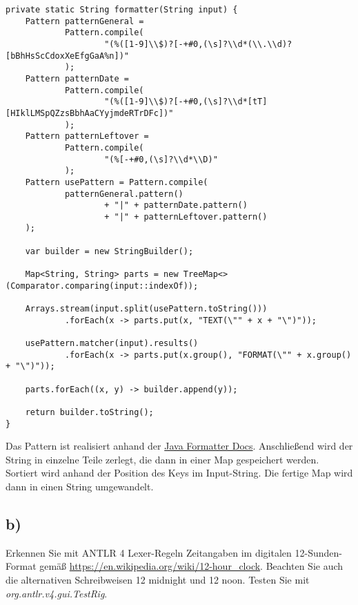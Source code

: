 \begin{lstlisting}[label={lst:Aufgabe1a}]
private static String formatter(String input) {
    Pattern patternGeneral =
            Pattern.compile(
                    "(%([1-9]\\$)?[-+#0,(\s]?\\d*(\\.\\d)?[bBhHsScCdoxXeEfgGaA%n])"
            );
    Pattern patternDate =
            Pattern.compile(
                    "(%([1-9]\\$)?[-+#0,(\s]?\\d*[tT][HIklLMSpQZzsBbhAaCYyjmdeRTrDFc])"
            );
    Pattern patternLeftover =
            Pattern.compile(
                    "(%[-+#0,(\s]?\\d*\\D)"
            );
    Pattern usePattern = Pattern.compile(
            patternGeneral.pattern()
                    + "|" + patternDate.pattern()
                    + "|" + patternLeftover.pattern()
    );

    var builder = new StringBuilder();

    Map<String, String> parts = new TreeMap<>(Comparator.comparing(input::indexOf));

    Arrays.stream(input.split(usePattern.toString()))
            .forEach(x -> parts.put(x, "TEXT(\"" + x + "\")"));

    usePattern.matcher(input).results()
            .forEach(x -> parts.put(x.group(), "FORMAT(\"" + x.group() + "\")"));

    parts.forEach((x, y) -> builder.append(y));

    return builder.toString();
}
\end{lstlisting}

Das Pattern ist realisiert anhand der \href{https://docs.oracle.com/javase/7/docs/api/java/util/Formatter.html}{Java Formatter Docs}. \newline
Anschließend wird der String in einzelne Teile zerlegt, die dann in einer Map gespeichert werden.
Sortiert wird anhand der Position des Keys im Input-String. \newline
Die fertige Map wird dann in einen String umgewandelt. \newline

\newpage

\subsection*{b)}
Erkennen Sie mit ANTLR 4 Lexer-Regeln Zeitangaben im digitalen 12-Sunden-Format gemäß \url{https://en.wikipedia.org/wiki/12-hour_clock}.
Beachten Sie auch die alternativen Schreibweisen 12 midnight und 12 noon. Testen Sie mit \textit{org.antlr.v4.gui.TestRig}.

